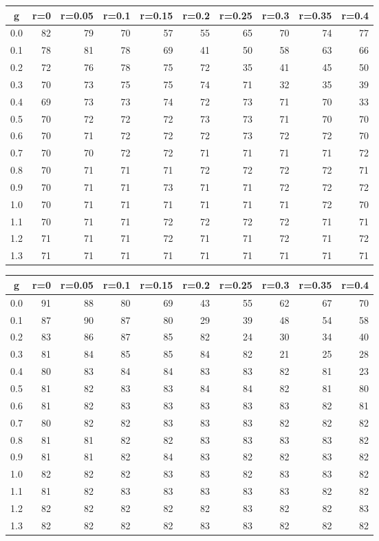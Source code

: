 %
\begin{table}[!tbp]
 \begin{center}
 \begin{tabular}{rrrrrrrrrr}\hline\hline
\multicolumn{1}{c}{g}&\multicolumn{1}{c}{r=0}&\multicolumn{1}{c}{r=0.05}&\multicolumn{1}{c}{r=0.1}&\multicolumn{1}{c}{r=0.15}&\multicolumn{1}{c}{r=0.2}&\multicolumn{1}{c}{r=0.25}&\multicolumn{1}{c}{r=0.3}&\multicolumn{1}{c}{r=0.35}&\multicolumn{1}{c}{r=0.4}\tabularnewline
\hline
0.0&82&79&70&57&55&65&70&74&77\tabularnewline
0.1&78&81&78&69&41&50&58&63&66\tabularnewline
0.2&72&76&78&75&72&35&41&45&50\tabularnewline
0.3&70&73&75&75&74&71&32&35&39\tabularnewline
0.4&69&73&73&74&72&73&71&70&33\tabularnewline
0.5&70&72&72&72&73&73&71&70&70\tabularnewline
0.6&70&71&72&72&72&73&72&72&70\tabularnewline
0.7&70&70&72&72&71&71&71&71&72\tabularnewline
0.8&70&71&71&71&72&72&72&72&71\tabularnewline
0.9&70&71&71&73&71&71&72&72&72\tabularnewline
1.0&70&71&71&71&71&71&71&72&70\tabularnewline
1.1&70&71&71&72&72&72&72&71&71\tabularnewline
1.2&71&71&71&72&71&71&72&71&72\tabularnewline
1.3&71&71&71&71&71&71&71&71&71\tabularnewline
\hline
\end{tabular}

\end{center}

\end{table}

%
\begin{table}[!tbp]
 \begin{center}
 \begin{tabular}{rrrrrrrrrr}\hline\hline
\multicolumn{1}{c}{g}&\multicolumn{1}{c}{r=0}&\multicolumn{1}{c}{r=0.05}&\multicolumn{1}{c}{r=0.1}&\multicolumn{1}{c}{r=0.15}&\multicolumn{1}{c}{r=0.2}&\multicolumn{1}{c}{r=0.25}&\multicolumn{1}{c}{r=0.3}&\multicolumn{1}{c}{r=0.35}&\multicolumn{1}{c}{r=0.4}\tabularnewline
\hline
0.0&91&88&80&69&43&55&62&67&70\tabularnewline
0.1&87&90&87&80&29&39&48&54&58\tabularnewline
0.2&83&86&87&85&82&24&30&34&40\tabularnewline
0.3&81&84&85&85&84&82&21&25&28\tabularnewline
0.4&80&83&84&84&83&83&82&81&23\tabularnewline
0.5&81&82&83&83&84&84&82&81&80\tabularnewline
0.6&81&82&83&83&83&83&83&82&81\tabularnewline
0.7&80&82&82&83&83&83&82&82&82\tabularnewline
0.8&81&81&82&82&83&83&83&83&82\tabularnewline
0.9&81&81&82&84&83&82&82&83&82\tabularnewline
1.0&82&82&82&83&83&82&83&83&82\tabularnewline
1.1&81&82&83&83&83&83&83&82&82\tabularnewline
1.2&82&82&82&82&82&83&82&82&83\tabularnewline
1.3&82&82&82&82&83&83&82&82&82\tabularnewline
\hline
\end{tabular}

\end{center}

\end{table}

